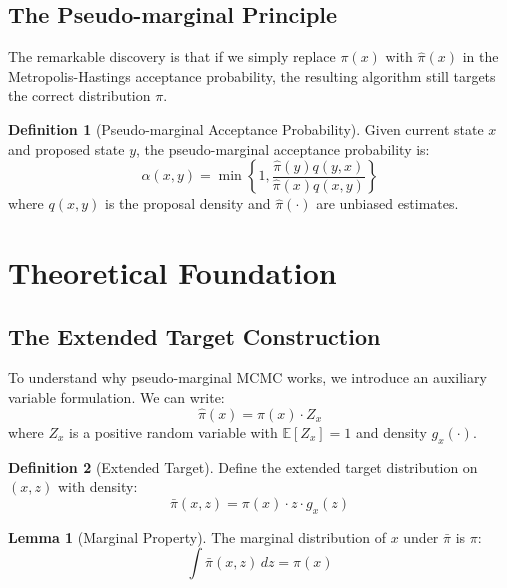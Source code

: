 \documentclass[11pt]{article}
\theoremstyle{definition}
\newtheorem{definition}{Definition}
\newtheorem{lemma}{Lemma}
\begin{document}
\subsection{The Pseudo-marginal Principle}

The remarkable discovery is that if we simply replace $\pi(x)$ with $\hat{\pi}(x)$ in the Metropolis-Hastings acceptance probability, the resulting algorithm still targets the correct distribution $\pi$.

\begin{definition}[Pseudo-marginal Acceptance Probability]
Given current state $x$ and proposed state $y$, the pseudo-marginal acceptance probability is:
\begin{equation}
\alpha(x,y) = \min\left\{1, \frac{\hat{\pi}(y)q(y,x)}{\hat{\pi}(x)q(x,y)}\right\}
\end{equation}
where $q(x,y)$ is the proposal density and $\hat{\pi}(\cdot)$ are unbiased estimates.
\end{definition}

\section{Theoretical Foundation}

\subsection{The Extended Target Construction}

To understand why pseudo-marginal MCMC works, we introduce an auxiliary variable formulation. We can write:
\begin{equation}
\hat{\pi}(x) = \pi(x) \cdot Z_x
\end{equation}
where $Z_x$ is a positive random variable with $\mathbb{E}[Z_x] = 1$ and density $g_x(\cdot)$.

\begin{definition}[Extended Target]
Define the extended target distribution on $(x,z)$ with density:
\begin{equation}
\bar{\pi}(x,z) = \pi(x) \cdot z \cdot g_x(z)
\end{equation}
\end{definition}

\begin{lemma}[Marginal Property]
The marginal distribution of $x$ under $\bar{\pi}$ is $\pi$:
\begin{equation}
\int \bar{\pi}(x,z) \, dz = \pi(x)
\end{equation}
\end{lemma}
\end{document}
